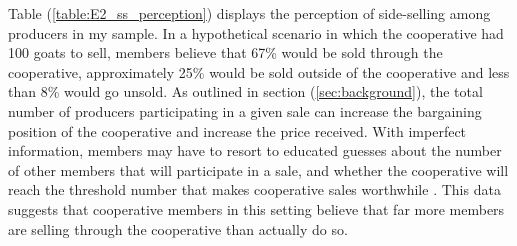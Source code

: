 \documentclass[11pt]{article}
\begin{document}
\singlespacing
\begin{table}[H]
  \centering
  \caption{Reasons for Side-Selling}
  \label{table:E2_ss_reason}
\end{table}
\doublespacing

Table (\ref{table:E2_ss_perception}) displays the perception of side-selling among producers in my sample. In a hypothetical scenario in which the cooperative had 100 goats to sell, members believe that 67\% would be sold through the cooperative, approximately 25\% would be sold outside of the cooperative and less than 8\% would go unsold. As outlined in section (\ref{sec:background}), the total number of producers participating in a given sale can increase the bargaining position of the cooperative and increase the price received. With imperfect information, members may have to resort to educated guesses about the number of other members that will participate in a sale, and whether the cooperative will reach the threshold number that makes cooperative sales worthwhile \citep{aflagah_cheap_2019}. This data suggests that cooperative members in this setting believe that far more members are selling through the cooperative than actually do so. 
\end{document}
